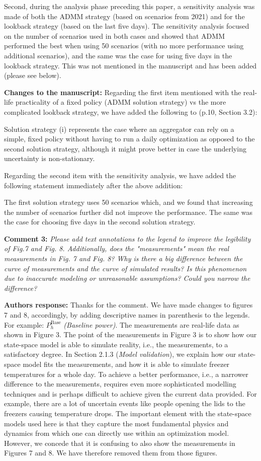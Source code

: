 \documentclass[10pt]{article}
\newcounter{models}
\newcommand{\nt}[1]{\textcolor{newtextcolor}{#1}}
\newcommand{\auth}{\textbf{Authors response: }}
\newcommand{\changes}{\textbf{Changes to the manuscript: }}
\begin{document}
Second, during the analysis phase preceding this paper, a sensitivity analysis was made of both the ADMM strategy (based on scenarios from 2021) and for the lookback strategy (based on the last five days). The sensitivity analysis focused on the number of scenarios used in both cases and showed that ADMM performed the best when using 50 scenarios (with no more performance using additional scenarios), and the same was the case for using five days in the lookback strategy. This was not mentioned in the manuscript and has been added (please see below).

\changes Regarding the first item mentioned with the real-life practicality of a fixed policy (ADMM solution strategy) vs the more complicated lookback strategy, we have added the following to (p.10, Section 3.2):

\nt{Solution strategy (i) represents the case where an aggregator can rely on a simple, fixed policy without having to run a daily optimization as opposed to the second solution strategy, although it might prove better in case the underlying uncertainty is non-stationary.}

Regarding the second item with the sensitivity analysis, we have added the following statement immediately after the above addition:

\nt{The first solution strategy uses 50 scenarios which, and we found that increasing the number of scenarios further did not improve the performance. The same was the case for choosing five days in the second solution strategy.}

\textbf{Comment 3:} \textit{Please add text annotations to the legend to improve the legibility of Fig.7 and Fig. 8. Additionally, does the "measurements" mean the real measurements in Fig. 7 and Fig. 8? Why is there a big difference between the curve of measurements and the curve of simulated results? Is this phenomenon due to inaccurate modeling or unreasonable assumptions? Could you narrow the difference?}

\auth Thanks for the comment. We have made changes to figures 7 and 8, accordingly, by adding descriptive names in parenthesis to the legends. For example: $P_{h}^{\text{Base}}$ \textit{(Baseline power)}. The measurements are real-life data as shown in Figure 3. The point of the measurements in Figure 3 is to show how our state-space model is able to simulate reality, i.e., the measurements, to a satisfactory degree. In Section 2.1.3 (\textit{Model validation}), we explain how our state-space model fits the measurements, and how it is able to simulate freezer temperatures for a whole day. To achieve a better performance, i.e., a narrower difference to the measurements, requires even more sophisticated modelling techniques and is perhaps difficult to achieve given the current data provided. For example, there are a lot of uncertain events like people opening the lids to the freezers causing temperature drops. The important element with the state-space models used here is that they capture the most fundamental physics and dynamics from which one can directly use within an optimization model. However, we concede that it is confusing to also show the measurements in Figures 7 and 8. We have therefore removed them from those figures.
\end{document}
